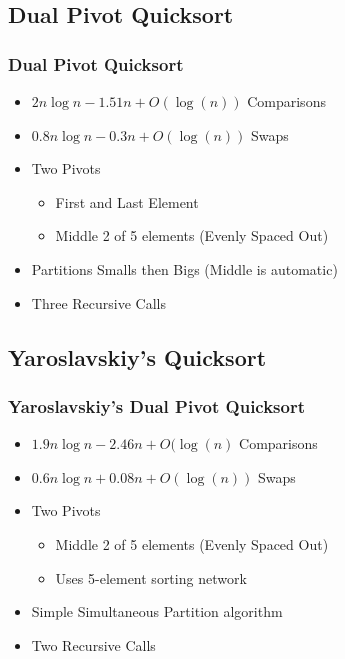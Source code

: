 		\subsection{Dual Pivot Quicksort}
			\begin{frame}
				\frametitle{Dual Pivot Quicksort}
				\begin{itemize}
					\item<+-> $2n \log n - 1.51n + O(\log(n))$ Comparisons
					\item<+-> $0.8n \log n -0.3n + O(\log(n))$ Swaps
					\item<+-> Two Pivots
					\begin{itemize}
						\item<+-> First and Last Element
						\item<+-> Middle 2 of 5 elements (Evenly Spaced Out)
					\end{itemize}
					\item<+-> Partitions Smalls then Bigs (Middle is automatic)
					\item<+-> Three Recursive Calls
				\end{itemize}
				\phantom{ }\cite{Aumuller:2013:OPD:2525857.2525862}
			\end{frame}

		\subsection{Yaroslavskiy's Quicksort}
			\begin{frame}
				\frametitle{Yaroslavskiy's Dual Pivot Quicksort}
				\begin{itemize}
					\item<+-> $1.9n \log n - 2.46n + O(\log(n)$ Comparisons
					\item<+-> $0.6n \log n + 0.08n + O(\log(n))$ Swaps
					\item<+-> Two Pivots
					\begin{itemize}
						\item<+-> Middle 2 of 5 elements (Evenly Spaced Out)
						\item<+-> Uses 5-element sorting network
					\end{itemize}
					\item<+-> Simple Simultaneous Partition algorithm
					\item<+-> Two Recursive Calls 
				\end{itemize}
				\phantom{ }\cite{Wild:2012:ACA:2404160.2404231}
			\end{frame}
		
